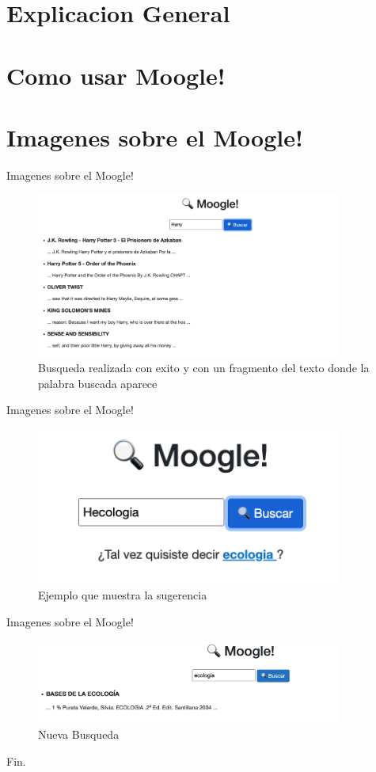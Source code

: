 \documentclass{beamer}
\begin{document}
\section{Explicacion General}
\section{Como usar Moogle!}
\section{Imagenes sobre el Moogle!}

\begin{frame}{Imagenes sobre el Moogle!}
	\begin{figure} [h]
		\center
		\includegraphics[width=10cm]{Pictures For Moogle!/Picture2.png}
		\caption{Busqueda realizada con exito y con un fragmento del texto donde la palabra buscada aparece}
		\label{fig:logo}
	\end{figure}
\end{frame}

\begin{frame}{Imagenes sobre el Moogle!}
	\begin{figure} [h]
		\center
		\includegraphics[width=10cm]{Pictures For Moogle!/Picture3.png}
		\caption{Ejemplo que muestra la sugerencia}
		\label{fig:logo}
	\end{figure}
\end{frame}

\begin{frame}{Imagenes sobre el Moogle!}
	\begin{figure} [h]
		\center
		\includegraphics[width=10cm]{Pictures For Moogle!/Picture4.png}
		\caption{Nueva Busqueda}
		\label{fig:logo}
	\end{figure}
\end{frame}

\begin{frame}
\Huge{\centerline{Fin.}}
\end{frame}
\end{document}
